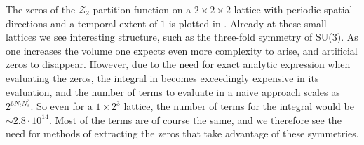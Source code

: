The zeros of the $\mathcal{Z}_2$ partition function on a $2\times{}2\times{}2$
lattice with periodic spatial directions and a temporal extent of $1$ is plotted
in . Already at these small lattices we see
interesting structure, such as the three-fold symmetry of SU($3$). As one
increases the volume one expects even more complexity to arise, and artificial
zeros to disappear. However, due to the need for exact analytic expression when
evaluating the zeros, the integral in 
becomes exceedingly expensive in its evaluation, and the number of terms to
evaluate in a naive approach scales as $2^{6 N_t N_s^3}$. So even for a
$1\times{}2^3$ lattice, the number of terms for the integral would be $\sim 2.8
\cdot 10^{14}$. Most of the terms are of course the same, and we therefore see
the need for methods of extracting the zeros that take advantage of these
symmetries.
